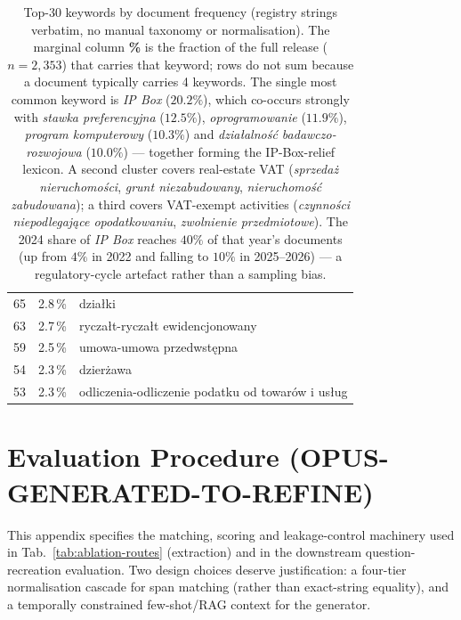 \begin{table}[!htb]
\begin{tabular}{@{}rrl@{}}
 65 &  2.8\,\% & dzia\l{}ki \\
 63 &  2.7\,\% & rycza\l{}t-rycza\l{}t ewidencjonowany \\
 59 &  2.5\,\% & umowa-umowa przedwst\k{e}pna \\
 54 &  2.3\,\% & dzier\.zawa \\
 53 &  2.3\,\% & odliczenia-odliczenie podatku od towar\'ow i us\l{}ug \\
\bottomrule
\end{tabular}
\caption{Top-30 keywords by document frequency (registry strings
verbatim, no manual taxonomy or normalisation). The marginal column
\textbf{\%} is the fraction of the full release ($n=2{,}353$) that
carries that keyword; rows do not sum because a document typically
carries 4 keywords. The single most common keyword is \textit{IP Box}
($20.2\%$), which co-occurs strongly with \textit{stawka preferencyjna}
($12.5\%$), \textit{oprogramowanie} ($11.9\%$), \textit{program
komputerowy} ($10.3\%$) and \textit{dzia\l{}alno\'s\'c badawczo-rozwojowa}
($10.0\%$) --- together forming the IP-Box-relief lexicon. A second
cluster covers real-estate VAT (\textit{sprzeda\.z nieruchomo\'sci},
\textit{grunt niezabudowany}, \textit{nieruchomo\'s\'c zabudowana});
a third covers VAT-exempt activities (\textit{czynno\'sci niepodlegaj\k{a}ce
opodatkowaniu}, \textit{zwolnienie przedmiotowe}). The 2024 share of
\textit{IP Box} reaches $40\%$ of that year's documents (up from
$4\%$ in 2022 and falling to $10\%$ in 2025--2026) --- a
regulatory-cycle artefact rather than a sampling bias.}
\label{tab:topic-distribution}
\end{table}


\section{Evaluation Procedure (OPUS-GENERATED-TO-REFINE)}
\label{app:evaluation}

This appendix specifies the matching, scoring and leakage-control
machinery used in Tab.~\ref{tab:ablation-routes} (extraction) and in
the downstream question-recreation evaluation. Two design choices
deserve justification: a four-tier normalisation cascade for span
matching (rather than exact-string equality), and a temporally
constrained few-shot/RAG context for the generator.

